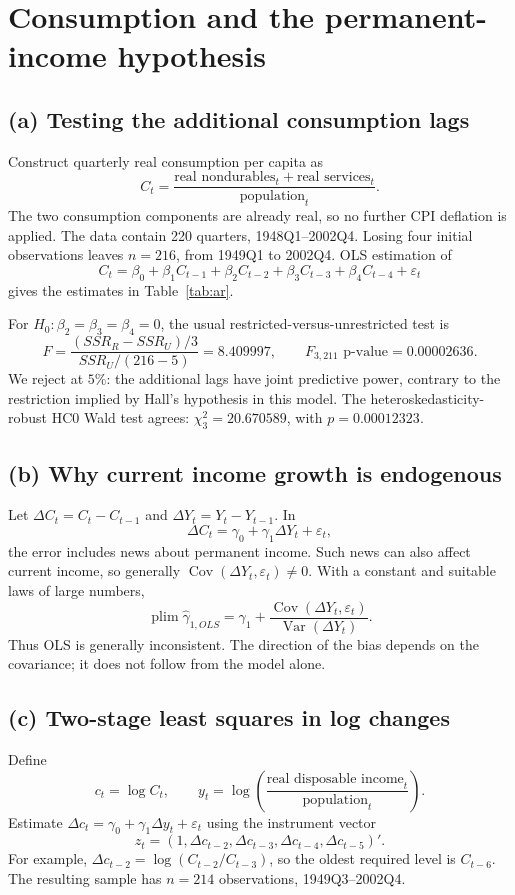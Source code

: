 \section{Consumption and the permanent-income hypothesis}

\subsection*{(a) Testing the additional consumption lags}
Construct quarterly real consumption per capita as
\[
C_t=\frac{\text{real nondurables}_t+\text{real services}_t}
{\text{population}_t}.
\]
The two consumption components are already real, so no further CPI
deflation is applied. The data contain 220 quarters, 1948Q1--2002Q4.
Losing four initial observations leaves $n=216$, from 1949Q1 to 2002Q4.
OLS estimation of
\[
C_t=\beta_0+\beta_1C_{t-1}+\beta_2C_{t-2}
+\beta_3C_{t-3}+\beta_4C_{t-4}+\varepsilon_t
\]
gives the estimates in Table~\ref{tab:ar}.
\begin{table}[H]
\centering
\caption{Consumption in levels: four autoregressive lags}
\label{tab:ar}

\end{table}
For $H_0:\beta_2=\beta_3=\beta_4=0$, the usual restricted-versus-unrestricted
test is
\[
F=\frac{(SSR_R-SSR_U)/3}{SSR_U/(216-5)}
=8.409997,\qquad F_{3,211}\text{ p-value}=0.00002636.
\]
We reject at $5\%$: the additional lags have joint predictive power,
contrary to the restriction implied by Hall's hypothesis in this model.
The heteroskedasticity-robust HC0 Wald test agrees:
$\chi^2_3=20.670589$, with $p=0.00012323$.

\subsection*{(b) Why current income growth is endogenous}
Let $\Delta C_t=C_t-C_{t-1}$ and $\Delta Y_t=Y_t-Y_{t-1}$.
In
\[
\Delta C_t=\gamma_0+\gamma_1\Delta Y_t+\varepsilon_t,
\]
the error includes news about permanent income. Such news can also affect
current income, so generally
$\operatorname{Cov}(\Delta Y_t,\varepsilon_t)\ne0$.
With a constant and suitable laws of large numbers,
\[
\operatorname{plim}\widehat\gamma_{1,OLS}
=\gamma_1+
\frac{\operatorname{Cov}(\Delta Y_t,\varepsilon_t)}
{\operatorname{Var}(\Delta Y_t)}.
\]
Thus OLS is generally inconsistent. The direction of the bias depends
on the covariance; it does not follow from the model alone.

\subsection*{(c) Two-stage least squares in log changes}
Define
\[
c_t=\log C_t,\qquad
y_t=\log\!\left(
\frac{\text{real disposable income}_t}{\text{population}_t}
\right).
\]
Estimate $\Delta c_t=\gamma_0+\gamma_1\Delta y_t+\varepsilon_t$
using the instrument vector
\[
z_t=(1,\Delta c_{t-2},\Delta c_{t-3},
             \Delta c_{t-4},\Delta c_{t-5})'.
\]
For example, $\Delta c_{t-2}=\log(C_{t-2}/C_{t-3})$,
so the oldest required level is $C_{t-6}$.
The resulting sample has $n=214$ observations, 1949Q3--2002Q4.


